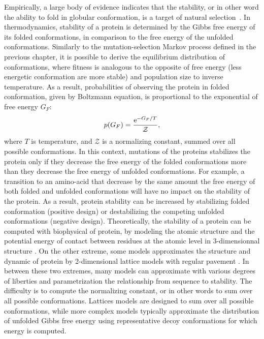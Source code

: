 Empirically, a large body of evidence indicates that the stability, or in other word the ability to fold in globular conformation, is a target of natural selection~\citep{Sikosek2014}.
In thermodynamics, stability of a protein is determined by the Gibbs free energy of its folded conformations, in comparison to the free energy of the unfolded conformations.
Similarly to the mutation-selection Markov process defined in the previous chapter, it is possible to derive the equilibrium distribution of conformations, where fitness is analogous to the opposite of free energy (less energetic conformation are more stable) and population size to inverse temperature.
As a result, probabilities of observing the protein in folded conformation, given by Boltzmann equation, is proportional to the exponential of free energy $G_F$:
\begin{align}
p(G_F) = \frac{\mathrm{e}^{-G_F / T}}{\mathcal{Z}},
\end{align}
where $T$ is temperature, and $\mathcal{Z}$ is a normalizing constant, summed over all possible conformations.
In this context, mutations of the proteins stabilizes the protein only if they decrease the free energy of the folded conformations more than they decrease the free energy of unfolded conformations.
For example, a {transition} to an amino-acid that decrease by the same amount the free energy of both folded and unfolded conformations will have no impact on the stability of the protein.
As a result, protein stability can be increased by stabilizing folded conformation (positive design) or destabilizing the competing unfolded conformations (negative design). 
Theoretically, the stability of a protein can be computed with biophysical of protein, by modeling the atomic structure and the potential energy of contact between residues at the atomic level in 3-dimensionnal structure \cite{Goldstein2011}.
On the other extreme, some models approximates the structure and dynamic of protein by 2-dimensional lattice models with regular pavement \cite{Noivirt-Brik2009}.
In between these two extremes, many models can approximate with various degrees of liberties and parametrization the relationship from sequence to stability.
The difficulty is to compute the normalizing constant, or in other words to sum over all possible conformations.
Lattices models are designed to sum over all possible conformations, while more complex models typically approximate the distribution of unfolded Gibbs free energy using representative decoy conformations for which energy is computed.

